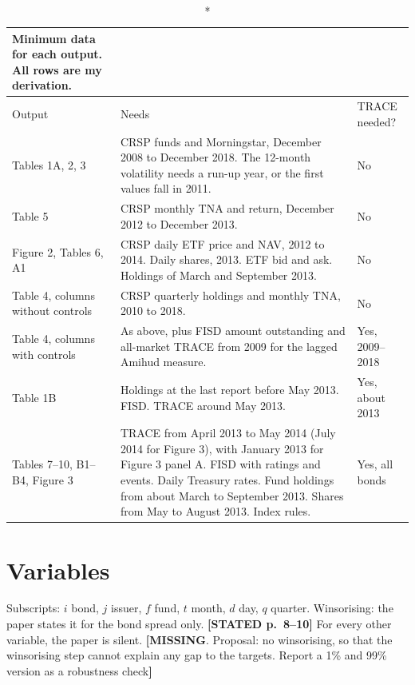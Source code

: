 \documentclass[10pt,a4paper]{article}
\newcommand{\ST}[1]{\textcolor{cst}{\textbf{[STATED #1]}}}
\newcommand{\MI}[1]{\textcolor{cmi}{\textbf{[MISSING}. Proposal: #1\textbf{]}}}
\begin{document}
\begin{longtable}{@{}P{3.3cm}P{9.2cm}P{4.5cm}@{}}
\caption*{\textbf{Minimum data for each output. All rows are my derivation.}}\\
\toprule
Output & Needs & TRACE needed?\\
\midrule\endhead
Tables 1A, 2, 3 & CRSP funds and Morningstar, December 2008 to December 2018. The 12-month volatility needs a run-up year, or the first values fall in 2011. & No\\
Table 5 & CRSP monthly TNA and return, December 2012 to December 2013. & No\\
Figure 2, Tables 6, A1 & CRSP daily ETF price and NAV, 2012 to 2014. Daily shares, 2013. ETF bid and ask. Holdings of March and September 2013. & No\\
Table 4, columns without controls & CRSP quarterly holdings and monthly TNA, 2010 to 2018. & No\\
Table 4, columns with controls & As above, plus FISD amount outstanding and all-market TRACE from 2009 for the lagged Amihud measure. & Yes, 2009--2018\\
Table 1B & Holdings at the last report before May 2013. FISD. TRACE around May 2013. & Yes, about 2013\\
Tables 7--10, B1--B4, Figure 3 & TRACE from April 2013 to May 2014 (July 2014 for Figure 3), with January 2013 for Figure 3 panel A. FISD with ratings and events. Daily Treasury rates. Fund holdings from about March to September 2013. Shares from May to August 2013. Index rules. & Yes, all bonds\\
\bottomrule
\end{longtable}

\section{Variables}\label{sec:vars}

Subscripts: $i$ bond, $j$ issuer, $f$ fund, $t$ month, $d$ day, $q$ quarter. Winsorising: the paper states it for the bond spread only. \ST{p.~8--10} For every other variable, the paper is silent. \MI{no winsorising, so that the winsorising step cannot explain any gap to the targets. Report a 1\% and 99\% version as a robustness check}
\end{document}
